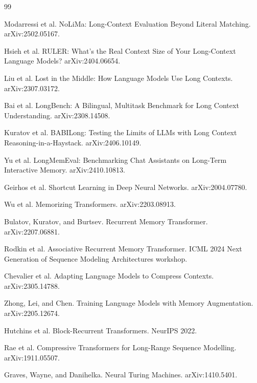 \documentclass{article}
\begin{document}
\begin{thebibliography}{99}

Modarressi et al.
\newblock NoLiMa: Long-Context Evaluation Beyond Literal Matching.
\newblock arXiv:2502.05167.

Hsieh et al.
\newblock RULER: What's the Real Context Size of Your Long-Context Language Models?
\newblock arXiv:2404.06654.

Liu et al.
\newblock Lost in the Middle: How Language Models Use Long Contexts.
\newblock arXiv:2307.03172.

Bai et al.
\newblock LongBench: A Bilingual, Multitask Benchmark for Long Context Understanding.
\newblock arXiv:2308.14508.

Kuratov et al.
\newblock BABILong: Testing the Limits of LLMs with Long Context Reasoning-in-a-Haystack.
\newblock arXiv:2406.10149.

Yu et al.
\newblock LongMemEval: Benchmarking Chat Assistants on Long-Term Interactive Memory.
\newblock arXiv:2410.10813.

Geirhos et al.
\newblock Shortcut Learning in Deep Neural Networks.
\newblock arXiv:2004.07780.

Wu et al.
\newblock Memorizing Transformers.
\newblock arXiv:2203.08913.

Bulatov, Kuratov, and Burtsev.
\newblock Recurrent Memory Transformer.
\newblock arXiv:2207.06881.

Rodkin et al.
\newblock Associative Recurrent Memory Transformer.
\newblock ICML 2024 Next Generation of Sequence Modeling Architectures workshop.

Chevalier et al.
\newblock Adapting Language Models to Compress Contexts.
\newblock arXiv:2305.14788.

Zhong, Lei, and Chen.
\newblock Training Language Models with Memory Augmentation.
\newblock arXiv:2205.12674.

Hutchins et al.
\newblock Block-Recurrent Transformers.
\newblock NeurIPS 2022.

Rae et al.
\newblock Compressive Transformers for Long-Range Sequence Modelling.
\newblock arXiv:1911.05507.

Graves, Wayne, and Danihelka.
\newblock Neural Turing Machines.
\newblock arXiv:1410.5401.


\end{thebibliography}
\end{document}
